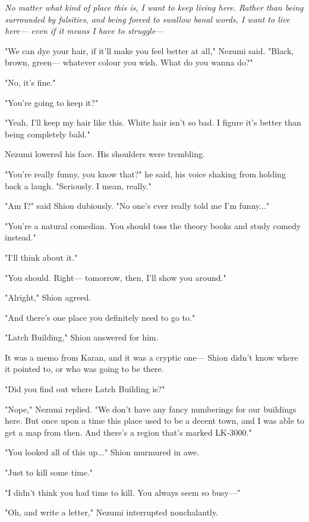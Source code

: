 \emph{No matter what kind of place this is, I want to keep living here. Rather
than being surrounded by falsities, and being forced to swallow banal
words, I want to live here--- even if it means I have to struggle---}

"We can dye your hair, if it'll make you feel better at all," Nezumi
said. "Black, brown, green--- whatever colour you wish. What do you wanna
do?"

"No, it's fine."

"You're going to keep it?"

"Yeah, I'll keep my hair like this. White hair isn't so bad. I figure
it's better than being completely bald."

Nezumi lowered his face. His shoulders were trembling.

"You're really funny, you know that?" he said, his voice shaking from
holding back a laugh. "Seriously. I mean, really."

"Am I?" said Shion dubiously. "No one's ever really told me I'm
funny..."

"You're a natural comedian. You should toss the theory books and study
comedy instead."

"I'll think about it."

"You should. Right--- tomorrow, then, I'll show you around."

"Alright," Shion agreed.

"And there's one place you definitely need to go to."

"Latch Building," Shion answered for him.


It was a memo from Karan, and it was a cryptic one--- Shion didn't know
where it pointed to, or who was going to be there.

"Did you find out where Latch Building is?"

"Nope," Nezumi replied. "We don't have any fancy numberings for our
buildings here. But once upon a time this place used to be a decent
town, and I was able to get a map from then. And there's a region that's
marked LK-3000."

"You looked all of this up..." Shion murmured in awe.

"Just to kill some time."

"I didn't think you had time to kill. You always seem so busy---"

"Oh, and write a letter," Nezumi interrupted nonchalantly.

